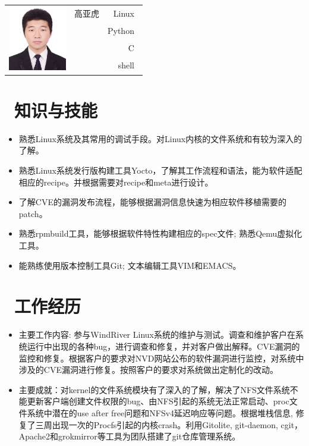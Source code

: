 \documentclass{resume}
\begin{document}
\Large{
  \begin{tabu}{ c l r }
     & \scshape{高亚虎} & {Linux~} \\
    &  & {Python~} \\
    &  & {C~} \\
    &  & {shell~}
  \end{tabu}
}
\section{\faGraduationCap\ 知识与技能}\normalsize
\begin{itemize}
  \item {熟悉Linux系统及其常用的调试手段。对Linux内核的文件系统和有较为深入的了解。}
  \item {熟悉Linux系统发行版构建工具Yocto，了解其工作流程和语法，能为软件适配相应的recipe。并根据需要对recipe和meta进行设计。}
  \item {了解CVE的漏洞发布流程，能够根据漏洞信息快速为相应软件移植需要的patch。}
  \item {熟悉rpmbuild工具，能够根据软件特性构建相应的spec文件; 熟悉Qemu虚拟化工具。}
  \item {能熟练使用版本控制工具Git; 文本编辑工具VIM和EMACS。}
  \end{itemize}

\section{\faUsers\ 工作经历}\normalsize
{}
\begin{itemize}
\item {主要工作内容: 参与WindRiver Linux系统的维护与测试。调查和维护客户在系统运行中出现的各种bug，进行调查和修复，并对客户做出解释。CVE漏洞的监控和修复。根据客户的要求对NVD网站公布的软件漏洞进行监控，对系统中涉及的CVE漏洞进行修复。按照客户的要求对系统做出定制化的改动。}
\item {主要成就：对kernel的文件系统模块有了深入的了解，解决了NFS文件系统不能更新客户端创建文件权限的bug、由NFS引起的系统无法正常启动、proc文件系统中潜在的use after free问题和NFSv4延迟响应等问题。根据堆栈信息, 修复了三周出现一次的Procfs引起的内核crash。利用Gitolite, git-daemon, cgit，Apache2和grokmirror等工具为团队搭建了git仓库管理系统。}
  \end{itemize}
\end{document}
